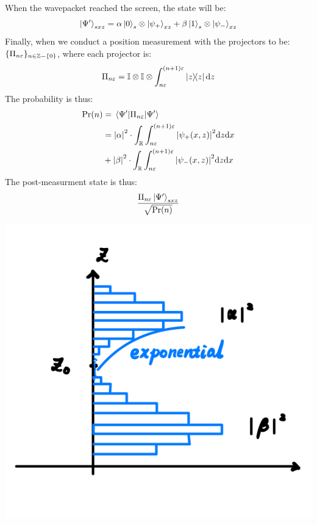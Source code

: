 When the wavepacket reached the screen, the state will be:
$$\ket{\Psi'}_{sxz} = \alpha\ket{0}_s \otimes \ket{\psi_+}_{xz} + \beta\ket{1}_s \otimes \ket{\psi_-}_{xz}$$
Finally, when we conduct a position measurement with the projectors to be: $\{\Pi_{n\varepsilon}\}_{n \in \mathbb{Z} - \{0\}}$, where each projector is:
$$\proj{n\varepsilon} = \id \otimes \id \otimes \int_{n\varepsilon}^{(n+1)\varepsilon} \dyad{z} \dd z$$
The probability is thus:
\begin{align*}
    \text{Pr}(n) &= \expval{\Pi_{n\varepsilon}}{\Psi'} \\
    &= \abs{\alpha}^2 \cdot \int_{\mathbb{R}} \int_{n\varepsilon}^{(n+1)\varepsilon} \abs{\psi_+(x, z)}^2 \dd z \dd x \\
    &+ \abs{\beta}^2 \cdot \int_{\mathbb{R}} \int_{n\varepsilon}^{(n+1)\varepsilon} \abs{\psi_-(x, z)}^2 \dd z \dd x
\end{align*}
The post-measurment state is thus:
$$\frac{\Pi_{n\varepsilon}\ket{\Psi'}_{sxz}}{\sqrt{\text{Pr}(n)}}$$
\begin{center}
    \includegraphics[scale = 0.5]{stern-gerlach-outcome.png}
\end{center}

\newpage